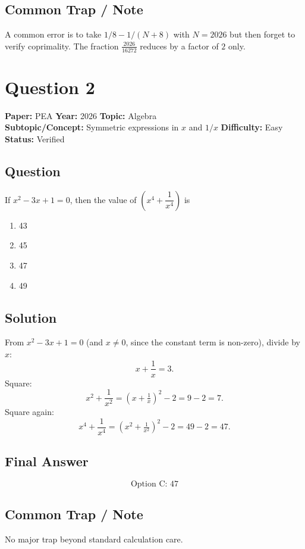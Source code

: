 \documentclass[11pt]{article}
\begin{document}
\subsection*{Common Trap / Note}
A common error is to take $1/8 - 1/(N+8)$ with $N=2026$ but then forget to verify
coprimality. The fraction $\tfrac{2026}{16272}$ reduces by a factor of $2$ only.

\section*{Question 2}
\textbf{Paper:} PEA \quad \textbf{Year:} 2026 \quad \textbf{Topic:} Algebra \\
\textbf{Subtopic/Concept:} Symmetric expressions in $x$ and $1/x$ \quad
\textbf{Difficulty:} Easy \quad \textbf{Status:} Verified

\subsection*{Question}
If $x^2 - 3x + 1 = 0$, then the value of $\left(x^4 + \dfrac{1}{x^4}\right)$ is
\begin{enumerate}[label=(\Alph*)]
\item 43 \item 45 \item 47 \item 49
\end{enumerate}

\subsection*{Solution}
From $x^2 - 3x + 1 = 0$ (and $x \ne 0$, since the constant term is non-zero), divide by $x$:
\[
x + \frac{1}{x} = 3.
\]
Square:
\[
x^2 + \frac{1}{x^2} = \left(x + \tfrac{1}{x}\right)^2 - 2 = 9 - 2 = 7.
\]
Square again:
\[
x^4 + \frac{1}{x^4} = \left(x^2 + \tfrac{1}{x^2}\right)^2 - 2 = 49 - 2 = 47.
\]

\subsection*{Final Answer}
\[
\boxed{\text{Option C: } 47}
\]

\subsection*{Common Trap / Note}
No major trap beyond standard calculation care.
\end{document}
